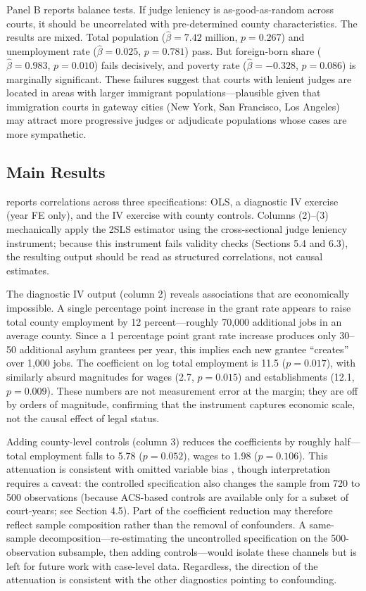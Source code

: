 \documentclass[12pt]{article}
\begin{document}
Panel B reports balance tests. If judge leniency is as-good-as-random across courts, it should be uncorrelated with pre-determined county characteristics. The results are mixed. Total population ($\hat{\beta} = 7.42$ million, $p = 0.267$) and unemployment rate ($\hat{\beta} = 0.025$, $p = 0.781$) pass. But foreign-born share ($\hat{\beta} = 0.983$, $p = 0.010$) fails decisively, and poverty rate ($\hat{\beta} = -0.328$, $p = 0.086$) is marginally significant. These failures suggest that courts with lenient judges are located in areas with larger immigrant populations---plausible given that immigration courts in gateway cities (New York, San Francisco, Los Angeles) may attract more progressive judges or adjudicate populations whose cases are more sympathetic.

\subsection{Main Results}



 reports correlations across three specifications: OLS, a diagnostic IV exercise (year FE only), and the IV exercise with county controls. Columns (2)--(3) mechanically apply the 2SLS estimator using the cross-sectional judge leniency instrument; because this instrument fails validity checks (Sections 5.4 and 6.3), the resulting output should be read as structured correlations, not causal estimates.

The diagnostic IV output (column 2) reveals associations that are economically impossible. A single percentage point increase in the grant rate appears to raise total county employment by 12 percent---roughly 70,000 additional jobs in an average county. Since a 1 percentage point grant rate increase produces only 30--50 additional asylum grantees per year, this implies each new grantee ``creates'' over 1,000 jobs. The coefficient on log total employment is 11.5 ($p = 0.017$), with similarly absurd magnitudes for wages (2.7, $p = 0.015$) and establishments (12.1, $p = 0.009$). These numbers are not measurement error at the margin; they are off by orders of magnitude, confirming that the instrument captures economic scale, not the causal effect of legal status.

Adding county-level controls (column 3) reduces the coefficients by roughly half---total employment falls to 5.78 ($p = 0.052$), wages to 1.98 ($p = 0.106$). This attenuation is consistent with omitted variable bias \citep{angrist2009mostly}, though interpretation requires a caveat: the controlled specification also changes the sample from 720 to 500 observations (because ACS-based controls are available only for a subset of court-years; see Section 4.5). Part of the coefficient reduction may therefore reflect sample composition rather than the removal of confounders. A same-sample decomposition---re-estimating the uncontrolled specification on the 500-observation subsample, then adding controls---would isolate these channels but is left for future work with case-level data. Regardless, the direction of the attenuation is consistent with the other diagnostics pointing to confounding.
\end{document}
